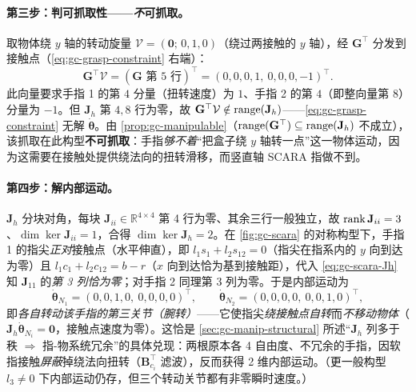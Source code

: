 \paragraph{第三步：判可抓取性——\emph{不}可抓取。}
取物体绕 $y$ 轴的转动旋量 $\mathcal{V}=(\mathbf{0};\,0,1,0)$（绕过两接触的 $y$ 轴），经 $\mathbf{G}^\top$ 分发到接触点（\cref{eq:gc-grasp-constraint} 右端）：
\begin{equation}
\mathbf{G}^\top\mathcal{V}=(\text{$\mathbf{G}$ 第 5 行})^\top=(0,0,0,1,\ 0,0,0,-1)^\top.
\label{eq:gc-scara-notmanip}
\end{equation}
此向量要求手指 1 的第 $4$ 分量（扭转速度）为 $1$、手指 2 的第 $4$（即整向量第 $8$）分量为 $-1$。但 $\mathbf{J}_h$ 第 $4,8$ 行为零，故 $\mathbf{G}^\top\mathcal{V}\notin\operatorname{range}(\mathbf{J}_h)$——\cref{eq:gc-grasp-constraint} 无解 $\dot{\boldsymbol{\theta}}$。由 \cref{prop:gc-manipulable}（$\operatorname{range}(\mathbf{G}^\top)\subseteq\operatorname{range}(\mathbf{J}_h)$ 不成立），该抓取在此构型\textbf{不可抓取}：手指\emph{够不着}“把盒子绕 $y$ 轴转一点”这一物体运动，因为这需要在接触处提供绕法向的扭转滑移，而竖直轴 SCARA 指做不到。

\paragraph{第四步：解内部运动。}
$\mathbf{J}_h$ 分块对角，每块 $\mathbf{J}_{ii}\in\mathbb{R}^{4\times4}$ 第 4 行为零、其余三行一般独立，故 $\operatorname{rank}\mathbf{J}_{ii}=3$、$\dim\ker\mathbf{J}_{ii}=1$，合得 $\dim\ker\mathbf{J}_h=2$。在 \cref{fig:gc-scara} 的对称构型下，手指 1 的指尖\emph{正对}接触点（水平伸直），即 $l_1s_1+l_2s_{12}=0$（指尖在指系内的 $y$ 向到达为零）且 $l_1c_1+l_2c_{12}=b-r$（$x$ 向到达恰为基到接触距），代入 \cref{eq:gc-scara-Jh} 知 $\mathbf{J}_{11}$ 的\emph{第 3 列恰为零}；对手指 2 同理第 3 列为零。于是内部运动为
\begin{equation}
\dot{\boldsymbol{\theta}}_{N_1}=(0,0,1,0,\ 0,0,0,0)^\top,\qquad
\dot{\boldsymbol{\theta}}_{N_2}=(0,0,0,0,\ 0,0,1,0)^\top,
\label{eq:gc-scara-internal}
\end{equation}
即\emph{各自转动该手指的第三关节（腕转）}——它使指尖\emph{绕接触点自转}而\emph{不移动物体}（$\mathbf{J}_h\dot{\boldsymbol{\theta}}_{N_i}=\mathbf{0}$，接触点速度为零）。这恰是 \cref{sec:gc-manip-structural} 所述“$\mathbf{J}_h$ 列多于秩 $\Rightarrow$ 指-物系统冗余”的具体兑现：两根原本各 4 自由度、不冗余的手指，因软指接触\emph{屏蔽}掉绕法向扭转（$\mathbf{B}_{c_i}^\top$ 滤波），反而获得 2 维内部运动。（更一般构型 $l_3\neq0$ 下内部运动仍存，但三个转动关节都有非零瞬时速度。）

